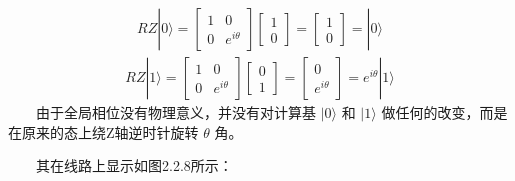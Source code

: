 \documentclass[a4paper,11pt,english]{sphinxmanual}
\begin{document}
\begin{equation*}
\begin{split}RZ|0\rangle=\left[\begin{array}{cc} 1 & 0 \\ 0 & e^{i \theta} \end{array}\right]\left[\begin{array}{l} 1 \\ 0 \end{array}\right]=\left[\begin{array}{c} 1 \\ 0 \end{array}\right]=|0\rangle\end{split}
\end{equation*}\begin{equation*}
\begin{split}RZ|1\rangle=\left[\begin{array}{cc} 1 & 0 \\ 0 & e^{i \theta} \end{array}\right]\left[\begin{array}{l} 0 \\ 1 \end{array}\right]=\left[\begin{array}{c} 0 \\ e^{i \theta} \end{array}\right]=e^{i \theta}|1\rangle\end{split}
\end{equation*}
\sphinxAtStartPar
  由于全局相位没有物理意义，并没有对计算基  \(|0\rangle\) 和  \(|1\rangle\) 做任何的改变，而是在原来的态上绕Z轴逆时针旋转 \(\theta\) 角。

\sphinxAtStartPar
  其在线路上显示如图2.2.8所示：

\end{document}
